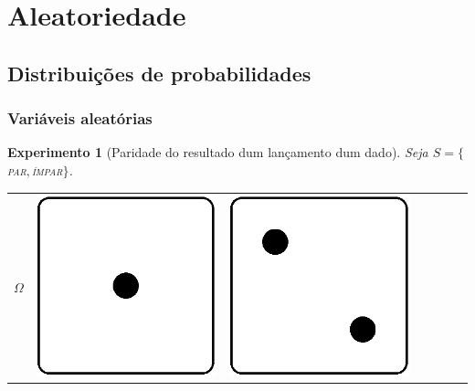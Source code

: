 \documentclass{beamer}
\theoremstyle{teoaxicorlem}
\theoremstyle{defnotnom}
\newtheorem{Expr}{Experimento}
\begin{document}
\section{Aleatoriedade}

\subsection{Distribuições de probabilidades}

\begin{frame}
  \frametitle{Variáveis aleatórias}
  \begin{Expr}[Paridade do resultado dum lançamento dum dado]
    Seja $S = \{$\textsc{par}$,$\textsc{ímpar}$\}$.\\[12pt]
    \begin{tabular}{lcccccc}
      $\Omega$ &
      \includegraphics[width=.05\paperwidth]{dado1.eps} &
      \includegraphics[width=.05\paperwidth]{dado2.eps} &

\end{tabular}
\end{Expr}
\end{frame}
\end{document}
